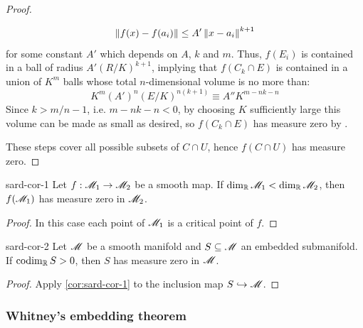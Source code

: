 \begin{proofbox}
\begin{proof}
\begin{enumerate}
        \begin{equation*}
          \left\lVert f(x) - f(a_i)\right\rVert \leq A' \left\lVert x - a_i\right\rVert^{k+1}
        \end{equation*}
        for some constant $ A' $ which depends on $ A $, $ k $ and $ m $. Thus, $ f(E_i) $ is contained in a ball of radius $ A'(R/K)^{k+1} $, implying that $ f(C_k \cap E) $ is contained in a union of $ K^m $ balls whose total $ n $-dimensional volume is no more than:
        \begin{equation*}
          K^m (A')^n (E/K)^{n(k+1)} \equiv A'' K^{m - nk - n}
        \end{equation*}
        Since $ k > m/n - 1 $, i.e. $ m - nk - n < 0 $, by choosing $ K $ sufficiently large this volume can be made as small as desired, so $ f(C_k \cap E) $ has measure zero by .
    \end{enumerate}
    These steps cover all possible subsets of $ C \cap U $, hence $ f(C \cap U) $ has measure zero.
  \end{proof}
\end{proofbox}

\begin{corollary}{}{sard-cor-1}
  Let $ f : \mathscr{M}_1 \rightarrow \mathscr{M}_2 $ be a smooth map. If $ \dim_{\mathbb{R}} \mathscr{M}_1 < \dim_{\mathbb{R}} \mathscr{M}_2 $, then $ f(\mathscr{M}_1) $ has measure zero in $ \mathscr{M}_2 $.
\end{corollary}

\begin{proofbox}
  \begin{proof}
    In this case each point of $ \mathscr{M}_1 $ is a critical point of $ f $.
  \end{proof}
\end{proofbox}

\begin{corollary}{}{sard-cor-2}
  Let $ \mathscr{M} $ be a smooth manifold and $ S \subseteq \mathscr{M} $ an embedded submanifold. If $ \operatorname{codim}_{\mathbb{R}} S > 0 $, then $ S $ has measure zero in $ \mathscr{M} $.
\end{corollary}

\begin{proofbox}
  \begin{proof}
    Apply \cref{cor:sard-cor-1} to the inclusion map $ S \hookrightarrow \mathscr{M} $.
  \end{proof}
\end{proofbox}

\subsubsection{Whitney's embedding theorem}

